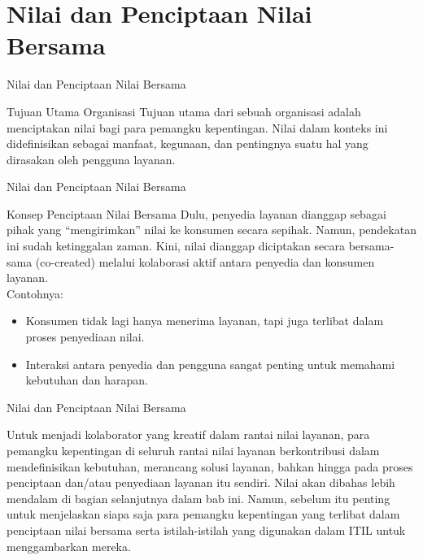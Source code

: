 \documentclass[aspectratio=179]{beamer}
\begin{document}
\section{Nilai dan Penciptaan Nilai Bersama}
\begin{frame}{Nilai dan Penciptaan Nilai Bersama}

    \begin{block}{Tujuan Utama Organisasi}
    {Tujuan utama dari sebuah organisasi adalah menciptakan nilai bagi para pemangku kepentingan. Nilai dalam konteks ini didefinisikan sebagai manfaat, kegunaan, dan pentingnya suatu hal yang dirasakan oleh pengguna layanan.}
    \end{block}
  
\end{frame}

\begin{frame}{Nilai dan Penciptaan Nilai Bersama}
   \begin{block}{Konsep Penciptaan Nilai Bersama}
      {Dulu, penyedia layanan dianggap sebagai pihak yang “mengirimkan” nilai ke konsumen secara sepihak. Namun, pendekatan ini sudah ketinggalan zaman. Kini, nilai dianggap diciptakan secara bersama-sama (co-created) melalui kolaborasi aktif antara penyedia dan konsumen layanan.\\Contohnya:}

  \begin{itemize}
      \item Konsumen tidak lagi hanya menerima layanan, tapi juga terlibat dalam proses penyediaan nilai.
      \item Interaksi antara penyedia dan pengguna sangat penting untuk memahami kebutuhan dan harapan.
  \end{itemize}
  \end{block}
\end{frame}

\begin{frame}{Nilai dan Penciptaan Nilai Bersama}
  \begin{block}{Untuk menjadi kolaborator yang kreatif dalam rantai nilai layanan, para pemangku kepentingan di seluruh rantai nilai layanan berkontribusi dalam mendefinisikan kebutuhan, merancang solusi layanan, bahkan hingga pada proses penciptaan dan/atau penyediaan layanan itu sendiri.}
  {Nilai akan dibahas lebih mendalam di bagian selanjutnya dalam bab ini. Namun, sebelum itu penting untuk menjelaskan siapa saja para pemangku kepentingan yang terlibat dalam penciptaan nilai bersama serta istilah-istilah yang digunakan dalam ITIL untuk menggambarkan mereka.}
  \end{block}
\end{frame}
\end{document}
